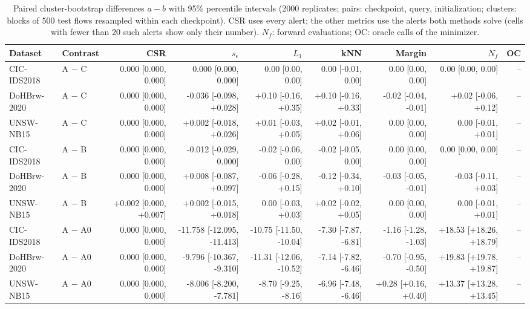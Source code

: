 \begin{table}[t]
\centering\scriptsize
\caption{Paired cluster-bootstrap differences $a-b$ with 95\% percentile intervals (2000 replicates; pairs: checkpoint, query, initialization; clusters: blocks of 500 test flows resampled within each checkpoint). CSR uses every alert; the other metrics use the alerts both methods solve (cells with fewer than 20 such alerts show only their number). $N_f$: forward evaluations; OC: oracle calls of the minimizer.}
\label{tab:a-bootstrap}
\begin{tabular}{@{}llrrrrrrr@{}}
\toprule
Dataset & Contrast & CSR & $s_\epsilon$ & $L_1$ & kNN & Margin & $N_f$ & OC \\
\midrule
CIC-IDS2018 & A $-$ C & 0.000 [0.000, 0.000] & 0.000 [0.000, 0.000] & 0.00 [0.00, 0.00] & 0.00 [-0.01, 0.00] & 0.00 [0.00, 0.00] & 0.00 [0.00, 0.00] & -- \\
DoHBrw-2020 & A $-$ C & 0.000 [0.000, 0.000] & -0.036 [-0.098, +0.028] & +0.10 [-0.16, +0.35] & +0.10 [-0.16, +0.33] & -0.02 [-0.04, -0.01] & +0.02 [-0.06, +0.12] & -- \\
UNSW-NB15 & A $-$ C & 0.000 [0.000, 0.000] & +0.002 [-0.018, +0.026] & +0.01 [-0.03, +0.05] & +0.02 [-0.01, +0.06] & 0.00 [0.00, 0.00] & 0.00 [-0.01, +0.01] & -- \\
CIC-IDS2018 & A $-$ B & 0.000 [0.000, 0.000] & -0.012 [-0.029, 0.000] & -0.02 [-0.06, 0.00] & -0.02 [-0.05, 0.00] & 0.00 [0.00, 0.00] & 0.00 [0.00, 0.00] & -- \\
DoHBrw-2020 & A $-$ B & 0.000 [0.000, 0.000] & +0.008 [-0.087, +0.097] & -0.06 [-0.28, +0.15] & -0.12 [-0.34, +0.10] & -0.03 [-0.05, -0.01] & -0.03 [-0.11, +0.03] & -- \\
UNSW-NB15 & A $-$ B & +0.002 [0.000, +0.007] & +0.002 [-0.015, +0.018] & 0.00 [-0.03, +0.03] & +0.02 [-0.02, +0.05] & 0.00 [0.00, 0.00] & 0.00 [-0.01, +0.01] & -- \\
CIC-IDS2018 & A $-$ A0 & 0.000 [0.000, 0.000] & -11.758 [-12.095, -11.413] & -10.75 [-11.50, -10.04] & -7.30 [-7.87, -6.81] & -1.16 [-1.28, -1.03] & +18.53 [+18.26, +18.79] & -- \\
DoHBrw-2020 & A $-$ A0 & 0.000 [0.000, 0.000] & -9.796 [-10.367, -9.310] & -11.31 [-12.06, -10.52] & -7.14 [-7.82, -6.46] & -0.70 [-0.95, -0.50] & +19.83 [+19.78, +19.87] & -- \\
UNSW-NB15 & A $-$ A0 & 0.000 [0.000, 0.000] & -8.006 [-8.200, -7.781] & -8.70 [-9.25, -8.16] & -6.96 [-7.48, -6.46] & +0.28 [+0.16, +0.40] & +13.37 [+13.28, +13.45] & -- \\

\end{tabular}
\end{table}
